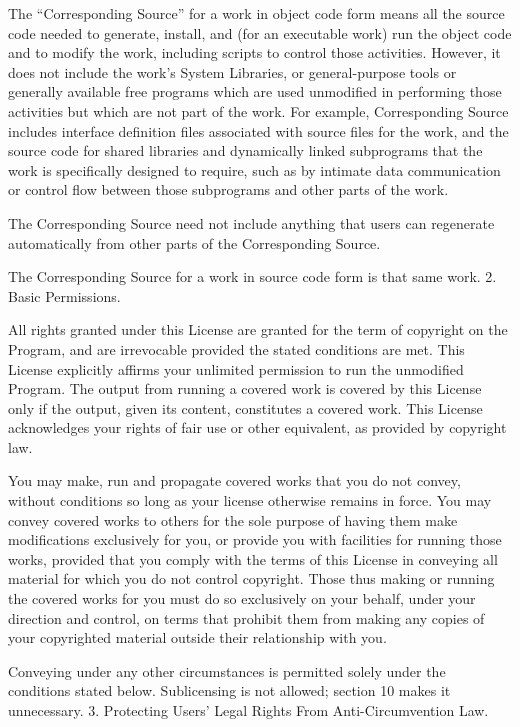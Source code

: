 {\begin{multicols}{4}
The “Corresponding Source” for a work in object code form means all the source code needed to generate, install, and (for an executable work) run the object code and to modify the work, including scripts to control those activities. However, it does not include the work's System Libraries, or general-purpose tools or generally available free programs which are used unmodified in performing those activities but which are not part of the work. For example, Corresponding Source includes interface definition files associated with source files for the work, and the source code for shared libraries and dynamically linked subprograms that the work is specifically designed to require, such as by intimate data communication or control flow between those subprograms and other parts of the work.

The Corresponding Source need not include anything that users can regenerate automatically from other parts of the Corresponding Source.

The Corresponding Source for a work in source code form is that same work.
2. Basic Permissions.

All rights granted under this License are granted for the term of copyright on the Program, and are irrevocable provided the stated conditions are met. This License explicitly affirms your unlimited permission to run the unmodified Program. The output from running a covered work is covered by this License only if the output, given its content, constitutes a covered work. This License acknowledges your rights of fair use or other equivalent, as provided by copyright law.

You may make, run and propagate covered works that you do not convey, without conditions so long as your license otherwise remains in force. You may convey covered works to others for the sole purpose of having them make modifications exclusively for you, or provide you with facilities for running those works, provided that you comply with the terms of this License in conveying all material for which you do not control copyright. Those thus making or running the covered works for you must do so exclusively on your behalf, under your direction and control, on terms that prohibit them from making any copies of your copyrighted material outside their relationship with you.

Conveying under any other circumstances is permitted solely under the conditions stated below. Sublicensing is not allowed; section 10 makes it unnecessary.
3. Protecting Users' Legal Rights From Anti-Circumvention Law.


\end{multicols}}
